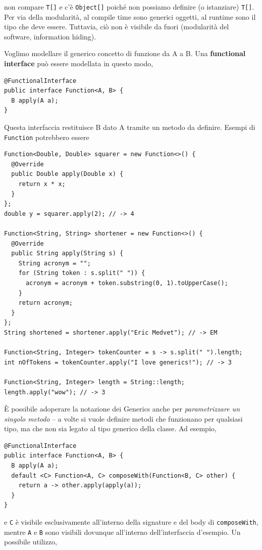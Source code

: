\documentclass[\fontsizeclass,twocolumn]{\classname}
\theoremstyle{definition}
\theoremstyle{definition}
\begin{document}
non compare \texttt{T[]} e c'è \texttt{Object[]} poiché non possiamo definire
(o istanziare) \texttt{T[]}. Per via della modularità, al compile time sono
generici oggetti, al runtime sono il tipo che deve essere. Tuttavia, ciò non è
visibile da fuori (modularità del software, information hiding).

Voglimo modellare il generico concetto di funzione da A a B. Una \textbf{functional interface} può essere modellata in questo modo, 

\begin{lstlisting}
@FunctionalInterface
public interface Function<A, B> {
  B apply(A a);
}
\end{lstlisting}

Questa interfaccia restituisce B dato A tramite un metodo da definire. Esempi di \texttt{Function} potrebbero essere

\begin{lstlisting}
Function<Double, Double> squarer = new Function<>() {
  @Override
  public Double apply(Double x) {
    return x * x;
  }
};
double y = squarer.apply(2); // -> 4

Function<String, String> shortener = new Function<>() {
  @Override
  public String apply(String s) {
    String acronym = "";
    for (String token : s.split(" ")) {
      acronym = acronym + token.substring(0, 1).toUpperCase();
    }
    return acronym;
  }
};
String shortened = shortener.apply("Eric Medvet"); // -> EM

Function<String, Integer> tokenCounter = s -> s.split(" ").length;
int nOfTokens = tokenCounter.apply("I love generics!"); // -> 3

Function<String, Integer> length = String::length;
length.apply("wow"); // -> 3
\end{lstlisting}

È possibile adoperare la notazione dei Generics anche per \emph{parametrizzare
un singolo metodo} -- a volte si vuole definire metodi che funzionano per
qualsiasi tipo, ma che non sia legato al tipo generico della classe. Ad esempio,

\begin{lstlisting}
@FunctionalInterface
public interface Function<A, B> {
  B apply(A a);
  default <C> Function<A, C> composeWith(Function<B, C> other) {
    return a -> other.apply(apply(a));
  }
}
\end{lstlisting}

e \texttt{C} è visibile esclusivamente all'interno della signature e del body
di \texttt{composeWith}, mentre \texttt{A} e \texttt{B} sono visibili dovunque
all'interno dell'interfaccia d'esempio. Un possibile utilizzo,
\end{document}
